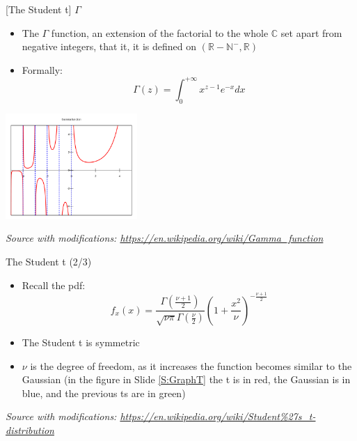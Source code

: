 \documentclass{beamer}
\begin{document}
\begin{frame}
{\centerline{[The Student t] $\Gamma$  }}

\begin{itemize}
\item  The $\Gamma$ function, an extension of the factorial to the whole $\mathbb{C}$ set apart from negative integers, that it, it is defined on $(\mathbb{R} - \mathbb{N^-},\mathbb{R})$
\item Formally:
$$\Gamma(z) = \int_0^{+ \infty} x ^{z-1} e ^{-x} dx$$

\end{itemize}
\begin{center}
\includegraphics[width=5cm]{P2023.AIBCCSS.InferenceAndLogisticRegression/600px-Gamma_plot.png}
\end{center} 

\textit{\tiny
\vspace{-\baselineskip}
Source with modifications: \url{https://en.wikipedia.org/wiki/Gamma_function}}

\end{frame}

\begin{frame}
{\centerline{The Student t (2/3)}}

\begin{itemize}
\item Recall the pdf:
$$f_x(x) = \frac { \Gamma \left({\frac {\nu +1}{2}}\right)} {{\sqrt {\nu \pi }} \Gamma \left({\frac {\nu }{2}} \right )} \left ( 1+{\frac {x^{2}}{\nu }} \right )^{-{\frac {\nu +1}{2}}}$$
\item The Student t is symmetric
\item $\nu$ is the degree of freedom, as it increases the function becomes similar to the Gaussian (in the figure in Slide \ref{S:GraphT} the t is in red, the Gaussian is in blue, and the previous ts are in green)
\end{itemize}
\textit{\tiny
\vspace{-\baselineskip}
Source with modifications: \url{https://en.wikipedia.org/wiki/Student\%27s_t-distribution}}

\end{frame}
\end{document}
